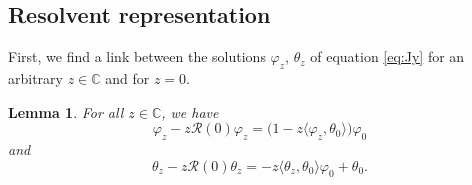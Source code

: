 \documentclass[10pt,a4paper]{amsart}
\numberwithin{equation}{section}
\newtheorem{Lemma}[Theorem]{Lemma}
\begin{document}
\subsection{Resolvent representation}\label{section3.2}

First, we find a link between the solutions $\varphi_{z}$, $\theta_{z}$ of equation \eqref{eq:Jy} for an arbitrary $z \in {\mathbb C}$ and for $z=0$.

\begin{Lemma}\label{PQ}
 For all $z \in {\mathbb C}$, we have
 \begin{equation}
\varphi_{z} - z {\mathcal R}(0) \varphi_{z}=\big( 1-z \langle \varphi_{z}, \theta_{0}\rangle \big) \varphi_{0}
\label{eq:PP1}\end{equation}
and
 \begin{equation}
\theta_{z} - z {\mathcal R}(0) \theta_{z}= - z \langle \theta_{z}, \theta_{0} \rangle \varphi_{0} + \theta_{0}.
\label{eq:QQ}\end{equation}
 \end{Lemma}
\end{document}
